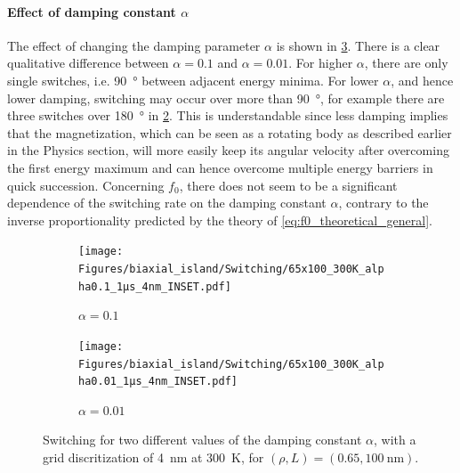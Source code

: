 \documentclass[12pt,a4paper]{article}
\begin{document}
\paragraph{Effect of damping constant $\alpha$}
The effect of changing the damping parameter $\alpha$ is shown in \cref{fig:switching-alpha}. There is a clear qualitative difference between $\alpha=0.1$ and $\alpha=0.01$. For higher $\alpha$, there are only single switches, i.e. \SI{90}{\degree} between adjacent energy minima. For lower $\alpha$, and hence lower damping, switching may occur over more than \SI{90}{\degree}, for example there are three switches over \SI{180}{\degree} in \cref{fig:switching-alpha-0.01}. This is understandable since less damping implies that the magnetization, which can be seen as a rotating body as described earlier in the Physics section, will more easily keep its angular velocity after overcoming the first energy maximum and can hence overcome multiple energy barriers in quick succession. Concerning $f_0$, there does not seem to be a significant dependence of the switching rate on the damping constant $\alpha$, contrary to the inverse proportionality predicted by the theory of \cref{eq:f0_theoretical_general}. %
\begin{figure}
     \centering
     \begin{subfigure}[b]{0.8\textwidth}
         \centering
         \texttt{[image: Figures/biaxial\_island/Switching/65x100\_300K\_alpha0.1\_1µs\_4nm\_INSET.pdf]}
         \caption{$\alpha=0.1$}
         \label{fig:switching-alpha-0.1}
     \end{subfigure}
     \hfill
     \begin{subfigure}[b]{0.8\textwidth}
         \centering
         \texttt{[image: Figures/biaxial\_island/Switching/65x100\_300K\_alpha0.01\_1µs\_4nm\_INSET.pdf]}
         \caption{$\alpha = 0.01$}
         \label{fig:switching-alpha-0.01}
     \end{subfigure}
        \caption{Switching for two different values of the damping constant $\alpha$, with a grid discritization of \SI{4}{\nano\metre} at \SI{300}{\kelvin}, for $(\rho, L) = (0.65, \SI{100}{\nano\metre})$.}
        \label{fig:switching-alpha}
\end{figure}
\end{document}
